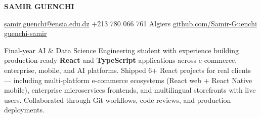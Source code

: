 \documentclass[8.5pt, letterpaper]{extarticle}
\begin{document}
{\centering
  {\fontsize{22}{26}\selectfont\bfseries\color{navy} SAMIR GUENCHI}\par\vspace{3pt}
  {\small\color{muted}
    \;\href{mailto:samir.guenchi@ensia.edu.dz}{samir.guenchi@ensia.edu.dz}
    \;\textbullet\;
    \;+213 780 066 761
    \;\textbullet\;
    \;Algiers
    \;\textbullet\;
    \;\href{https://github.com/Samir-Guenchi}{github.com/Samir-Guenchi}
    \;\textbullet\;
    \;\href{https://linkedin.com/in/guenchi-samir}{guenchi-samir}
  }\par
}
\vspace{4pt}

\noindent\colorbox{navy!6}{\parbox{\dimexpr\linewidth-2\fboxsep}{%
  \vspace{3pt}\small\color{navy}
  Final-year AI \& Data Science Engineering student with experience building production-ready \textbf{React} and \textbf{TypeScript} applications across e-commerce, enterprise, mobile, and AI platforms.
  Shipped 6+ React projects for real clients — including multi-platform e-commerce ecosystems (React web + React Native mobile), enterprise microservices frontends, and multilingual storefronts with live users.
  Collaborated through Git workflows, code reviews, and production deployments.
  \vspace{3pt}
}}
\vspace{4pt}
\end{document}
